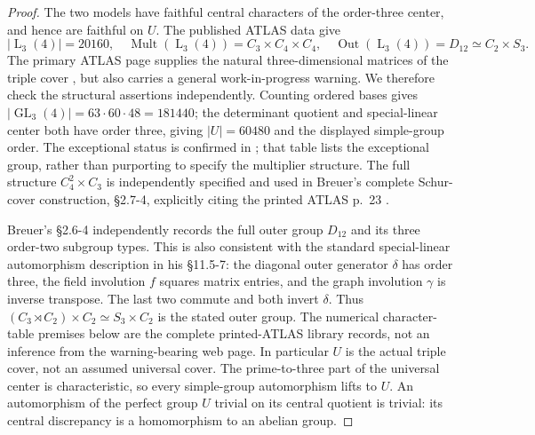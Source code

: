 \begin{proof}
The two models have faithful central characters of the order-three
center, and hence are faithful on $U$. The published ATLAS data give
\[
 |\operatorname{L}_3(4)|=20160,\quad
 \operatorname{Mult}(\operatorname{L}_3(4))=C_3\times C_4\times C_4,
 \quad\operatorname{Out}(\operatorname{L}_3(4))=D_{12}
          \simeq C_2\times S_3.                              \tag{LW.6}
\]
The primary ATLAS page supplies the natural three-dimensional
matrices of the triple cover \cite{BI:AtlasL34}, but also carries
a general work-in-progress warning. We therefore check the
structural assertions independently. Counting ordered bases gives
$|\operatorname{GL}_3(4)|=63\cdot60\cdot48=181440$; the
determinant quotient and special-linear center both have order
three, giving $|U|=60480$ and the displayed simple-group order.
The exceptional status is confirmed in \cite[Chapter~5,
Table~1, p.~35]{BI:HHM}; that table lists the exceptional group,
rather than purporting to specify the multiplier structure.
The full structure $C_4^2\times C_3$ is independently specified
and used in Breuer's complete Schur-cover construction,
\S2.7-4, explicitly citing the printed ATLAS p.~23
\cite{BI:BreuerL34}.

Breuer's \S2.6-4 independently records the full outer group
$D_{12}$ and its three order-two subgroup types. This is also
consistent with the standard special-linear automorphism
description in his \S11.5-7: the diagonal outer generator
$\delta$ has order three, the field involution $f$ squares
matrix entries, and the graph involution $\gamma$ is inverse
transpose. The last two commute and both invert $\delta$.
Thus $(C_3\rtimes C_2)\times C_2\simeq S_3\times C_2$
is the stated outer group. The numerical character-table
premises below are the complete printed-ATLAS library records,
not an inference from the warning-bearing web page.
In particular $U$ is the actual triple cover,
not an assumed universal cover. The prime-to-three part of the
universal center is characteristic, so every simple-group
automorphism lifts to $U$. An automorphism of the perfect group
$U$ trivial on its central quotient is trivial: its central
discrepancy is a homomorphism to an abelian group.


\end{proof}

